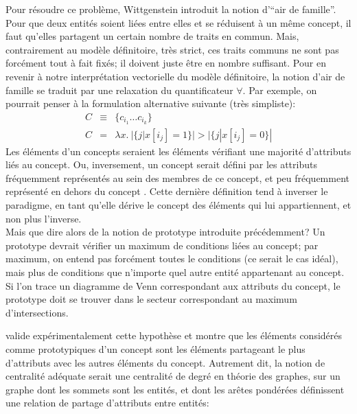 \documentclass[french]{article}
\begin{document}
				Pour résoudre ce problème, Wittgenstein introduit la notion d'``air de famille''. Pour que deux entités soient liées entre elles et se réduisent à un même concept, il faut qu'elles partagent un certain nombre de traits en commun. Mais, contrairement au modèle définitoire, très strict, ces traits communs ne sont pas forcément tout à fait fixés; il doivent juste être en nombre suffisant. Pour en revenir à notre interprétation vectorielle du modèle définitoire, la notion d'air de famille se traduit par une relaxation du quantificateur $\forall$. Par exemple, on pourrait penser à la formulation alternative suivante (très simpliste):
				\begin{eqnarray}
				C &\equiv&  \lbrace c_{i_1} \dots c_{i_k} \rbrace \\
				C &=& \lambda x. \ |\lbrace j | x[i_j] = 1 \rbrace| > |\lbrace j | x[i_j] = 0 \rbrace|
				\end{eqnarray}
				Les éléments d'un concepts seraient les éléments vérifiant une majorité d'attributs liés au concept. Ou, inversement, un concept serait défini par les attributs fréquemment représentés au sein des membres de ce concept, et peu fréquemment représenté en dehors du concept \cite{rosch1975}. Cette dernière définition tend à inverser le paradigme, en tant qu'elle dérive le concept des éléments qui lui appartiennent, et non plus l'inverse.\\
				Mais que dire alors de la notion de prototype introduite précédemment? Un prototype devrait vérifier un maximum de conditions liées au concept; par maximum, on entend pas forcément toutes le conditions (ce serait le cas idéal), mais plus de conditions que n'importe quel autre entité appartenant au concept. Si l'on trace un diagramme de Venn correspondant aux attributs du concept, le prototype doit se trouver dans le secteur correspondant au maximum d'intersections.
				\begin{figure}[H]
					\centering
				\end{figure}
				\cite{rosch1975} valide expérimentalement cette hypothèse et montre que les éléments considérés comme prototypiques d'un concept sont les éléments partageant le plus d'attributs avec les autres éléments du concept. Autrement dit, la notion de centralité adéquate serait une centralité de degré en théorie des graphes, sur un graphe dont les sommets sont les entités, et dont les arêtes pondérées définissent une relation de partage d'attributs entre entités:
\end{document}
